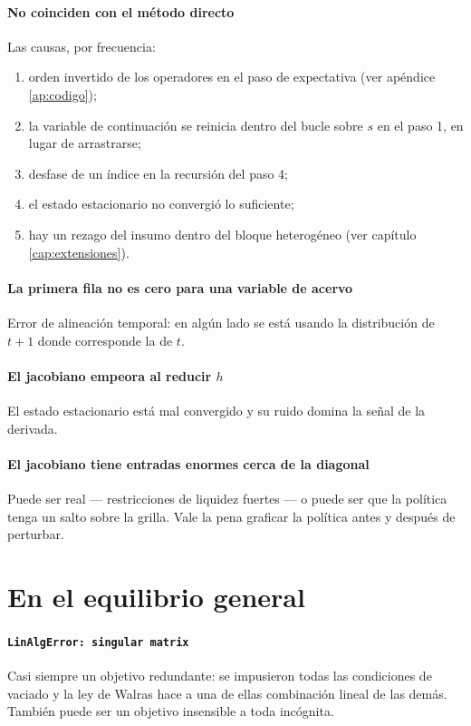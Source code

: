 \paragraph{No coinciden con el método directo} Las causas, por frecuencia:
\begin{enumerate}[leftmargin=1.4em,itemsep=1pt]
\item orden invertido de los operadores en el paso de expectativa (ver apéndice
\ref{ap:codigo});
\item la variable de continuación se reinicia dentro del bucle sobre $s$ en el
paso 1, en lugar de arrastrarse;
\item desfase de un índice en la recursión del paso 4;
\item el estado estacionario no convergió lo suficiente;
\item hay un rezago del insumo dentro del bloque heterogéneo (ver capítulo
\ref{cap:extensiones}).
\end{enumerate}

\paragraph{La primera fila no es cero para una variable de acervo} Error de
alineación temporal: en algún lado se está usando la distribución de $t+1$ donde
corresponde la de $t$.

\paragraph{El jacobiano empeora al reducir $h$} El estado estacionario está mal
convergido y su ruido domina la señal de la derivada.

\paragraph{El jacobiano tiene entradas enormes cerca de la diagonal} Puede ser
real --- restricciones de liquidez fuertes --- o puede ser que la política tenga
un salto sobre la grilla. Vale la pena graficar la política antes y después de
perturbar.

\section{En el equilibrio general}

\paragraph{\texttt{LinAlgError: singular matrix}} Casi siempre un objetivo
redundante: se impusieron todas las condiciones de vaciado y la ley de Walras
hace a una de ellas combinación lineal de las demás. También puede ser un objetivo
insensible a toda incógnita.

